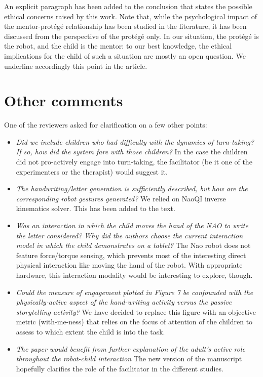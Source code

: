 \documentclass{article}
\begin{document}
An explicit paragraph has been added to the conclusion that states the possible
ethical concerns raised by this work. Note that, while the psychological impact of the
mentor-protégé relationship has been studied in the literature, it has been
discussed from the perspective of the protégé only. In our situation, the protégé
is the robot, and the child is the mentor: to our best knowledge, the ethical
implications for the child of such a situation are mostly an open question. We
underline accordingly this point in the article.

\section*{Other comments}

One of the reviewers asked for clarification on a few other points:

\begin{itemize}

\item \emph{Did we include children who had difficulty with the dynamics of
turn-taking? If so, how did the system fare with those children?} In the case
the children did not pro-actively engage into turn-taking, the facilitator (be
it one of the experimenters or the therapist) would suggest it.

\item \emph{The handwriting/letter generation is sufficiently described, but
how are the corresponding robot gestures generated?} We relied on NaoQI inverse
kinematics solver. This has been added to the text.

\item \emph{Was an interaction in which the child moves the hand of the NAO to
write the letter considered? Why did the authors choose the current interaction
model in which the child demonstrates on a tablet?} The Nao robot does not
feature force/torque sensing, which prevents most of the interesting direct
physical interaction like moving the hand of the robot. With appropriate
hardware, this interaction modality would be interesting to explore, though.

\item \emph{Could the measure of engagement plotted in Figure 7 be confounded
with the physically-active aspect of the hand-writing activity versus the
passive storytelling activity?} We have decided to replace this figure with an
objective metric (with-me-ness) that relies on the focus of attention of the
children to assess to which extent the child is into the task.

\item \emph{The paper would benefit from further explanation of the adult's
active role throughout the robot-child interaction} The new version of the manuscript hopefully
clarifies the role of the facilitator in the different studies.

\end{itemize}
\end{document}
